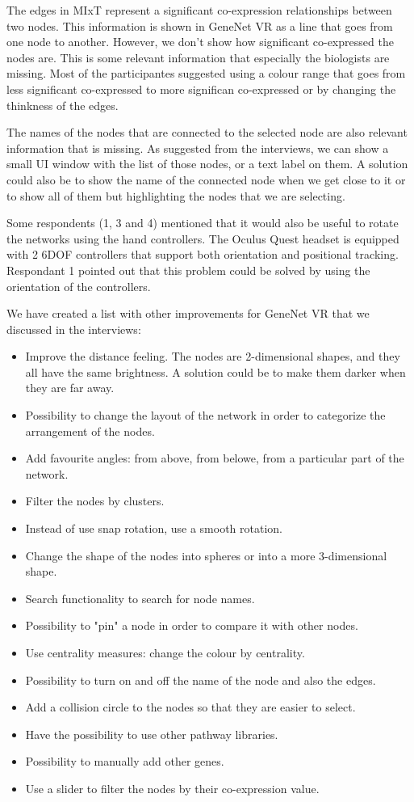The edges in MIxT represent a significant co-expression relationships between two nodes. This information is shown in GeneNet VR as a line that goes from one node to another. However, we don't show how significant co-expressed the nodes are. This is some relevant information that especially the biologists are missing. Most of the participantes suggested using a colour range that goes from less significant co-expressed to more significan co-expressed or by changing the thinkness of the edges.

The names of the nodes that are connected to the selected node are also relevant information that is missing. As suggested from the interviews, we can show a small UI window with the list of those nodes, or a text label on them. A solution could also be to show the name of the connected node when we get close to it or to show all of them but highlighting the nodes that we are selecting.

Some respondents (1, 3 and 4) mentioned that it would also be useful to rotate the networks using the hand controllers. The Oculus Quest headset is equipped with 2 6DOF controllers that support both orientation and positional tracking. Respondant 1 pointed out that this problem could be solved by using the orientation of the controllers.

We have created a list with other improvements for GeneNet VR that we discussed in the interviews:
\begin{itemize}
  \item Improve the distance feeling. The nodes are 2-dimensional shapes, and they all have the same brightness. A solution could be to make them darker when they are far away.
  \item Possibility to change the layout of the network in order to categorize the arrangement of the nodes.
  \item Add favourite angles: from above, from belowe, from a particular part of the network.
  \item Filter the nodes by clusters.
  \item Instead of use snap rotation, use a smooth rotation.
  \item Change the shape of the nodes into spheres or into a more 3-dimensional shape.
  \item Search functionality to search for node names.
  \item Possibility to "pin" a node in order to compare it with other nodes.
  \item Use centrality measures: change the colour by centrality.
  \item Possibility to turn on and off the name of the node and also the edges.
  \item Add a collision circle to the nodes so that they are easier to select.
  \item Have the possibility to use other pathway libraries.
  \item Possibility to manually add other genes.
  \item Use a slider to filter the nodes by their co-expression value.
\end{itemize}

